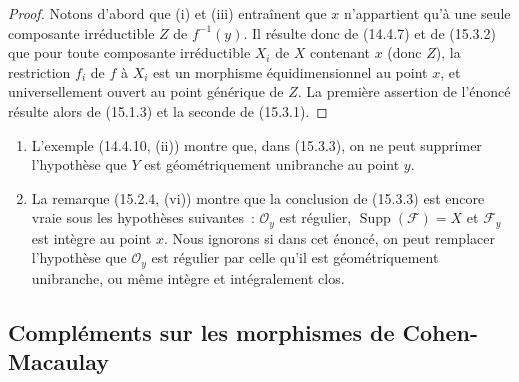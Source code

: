 \begin{proof}
Notons d'abord que (i) et (iii) entraînent que $x$ n'appartient qu'à une seule
composante irréductible $Z$ de $f^{-1}(y)$. Il résulte donc de (14.4.7) et de
(15.3.2) que pour toute composante irréductible $X_i$ de $X$ contenant $x$
(donc $Z$), la restriction $f_i$ de $f$ à $X_i$ est un morphisme
équidimensionnel au point $x$, et universellement ouvert au point générique de
$Z$. La première assertion de l'énoncé résulte alors de (15.1.3) et la seconde
de (15.3.1).
\end{proof}

\begin{remarks}[15.3.4]
\label{IV.15.3.4-fr}
\begin{enumerate}[label=(\roman*)]
  \item L'exemple (14.4.10, (ii)) montre que, dans (15.3.3), on ne peut
  supprimer l'hypothèse que $Y$ est géométriquement unibranche au point $y$.
  \item La remarque (15.2.4, (vi)) montre que la conclusion de (15.3.3) est
  encore vraie sous les hypothèses suivantes~: $\mathcal O_y$ est régulier,
  $\operatorname{Supp}(\mathcal F)=X$ et $\mathcal F_y$ est intègre au point
  $x$. Nous ignorons si dans cet énoncé, on peut remplacer l'hypothèse que
  $\mathcal O_y$ est régulier par celle qu'il est géométriquement unibranche, ou
  même intègre et intégralement clos.
\end{enumerate}
\end{remarks}

\subsection{Compléments sur les morphismes de Cohen-Macaulay}
\label{subsection:IV.15.4-fr}

